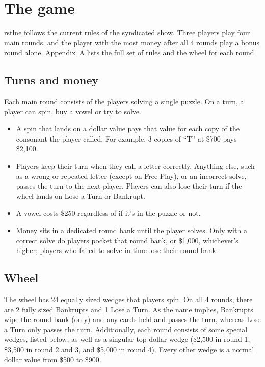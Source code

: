 \section{The game}\label{sec:game}

rstlne follows the current rules of the syndicated show. Three players play four main rounds, and the player with the most money after all 4 rounds play a bonus round alone. Appendix~A lists the full set of rules and the wheel for each round.

\subsection{Turns and money}

Each main round consists of the players solving a single puzzle. On a turn, a player can spin, buy a vowel or try to solve.
\begin{itemize}
  \item A spin that lands on a dollar value pays that value for each copy of the consonant the player called. For example, 3 copies of ``T'' at \$700 pays \$2,100.
  \item Players keep their turn when they call a letter correctly. Anything else, such as a wrong or repeated letter (except on Free Play), or an incorrect solve, passes the turn to the next player. Players can also lose their turn if the wheel lands on Lose a Turn or Bankrupt.
  \item A vowel costs \$250 regardless of if it's in the puzzle or not.
  \item Money sits in a dedicated round bank until the player solves. Only with a correct solve do players pocket that round bank, or \$1,000, whichever's higher; players who failed to solve in time lose their round bank. 
\end{itemize}

\subsection{Wheel}

The wheel has 24 equally sized wedges that players spin. On all 4 rounds, there are 2 fully sized Bankrupts and 1 Lose a Turn. As the name implies, Bankrupts wipe the round bank (only) and any cards held and passes the turn, whereas Lose a Turn only passes the turn. Additionally, each round consists of some special wedges, listed below, as well as a singular top dollar wedge (\$2,500 in round 1, \$3,500 in round 2 and 3, and \$5,000 in round 4). Every other wedge is a normal dollar value from \$500 to \$900. 

